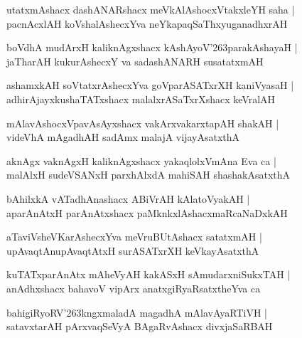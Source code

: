 \documentclass[twoside,12pt,openright]{book}
\def\S{\char'263}
\newcounter{shloka}[chapter]
\begin{document}
\begin{shloka}
utatxmAshacx dashANARshacx meVkAlAshocxVtakxleYH saha |\\
pacnAcxlAH koVshalAshecxYva neYkapaqSaThxyuganadhxrAH
\end{shloka}

\begin{shloka}
boVdhA mudArxH kaliknAgxshacx kAshAyoV\S parakAshayaH |\\
jaTharAH kukurAshecxY va sadashANARH susatatxmAH
\end{shloka}

\begin{shloka}
ashamxkAH soVtatxrAshecxYva goVparASATxrXH kaniVyasaH |\\
adhirAjayxkushaTATxshacx malalxrASaTxrXshacx keVralAH
\end{shloka}

\begin{shloka}
mAlavAshocxVpavAsAyxshacx vakArxvakarxtapAH shakAH |\\
videVhA mAgadhAH sadAmx malajA vijayAsatxthA
\end{shloka}

\begin{shloka}
aknAgx vaknAgxH kaliknAgxshacx yakaqlolxVmAna Eva ca |\\
malAlxH sudeVSANxH parxhAlxdA mahiSAH shashakAsatxthA
\end{shloka}

\begin{shloka}
bAhilxkA vATadhAnashacx ABiVrAH kAlatoVyakAH |\\
aparAnAtxH parAnAtxshacx paMknkxlAshacxmaRcaNaDxkAH
\end{shloka}


\begin{shloka}
aTaviVsheVKarAshecxYva meVruBUtAshacx satatxmAH |\\
upAvaqtAnupAvaqtAtxH surASATxrXH keVkayAsatxthA
\end{shloka}

\begin{shloka}
kuTATxparAnAtx mAheVyAH kakASxH sAmudarxniSukxTAH |\\
anAdhxshacx bahavoV vipArx anatxgiRyaRsatxtheYva ca
\end{shloka}

\begin{shloka}
bahigiRyoRV\S kngxmaladA magadhA mAlavAyaRTiVH |\\
satavxtarAH pArxvaqSeVyA BAgaRvAshacx divxjaSaRBAH
\end{shloka}
\end{document}
